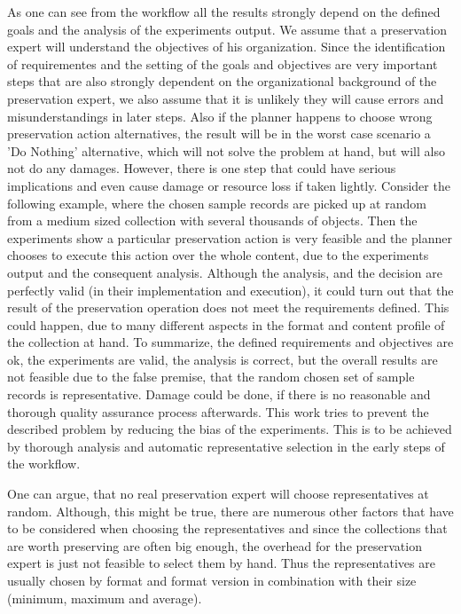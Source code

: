 As one can see from the workflow all the results strongly depend on the defined goals and the analysis of the experiments output. We assume that a preservation expert will understand the objectives of his organization. Since the identification of requirementes and the setting of the goals and objectives are very important steps that are also strongly dependent on the organizational background of the preservation expert, we also assume that it is unlikely they will cause errors and misunderstandings in later steps. Also if the planner happens to choose wrong preservation action alternatives, the result will be in the worst case scenario a 'Do Nothing' alternative, which will not solve the problem at hand, but will also not do any damages.
However, there is one step that could have serious implications and even cause damage or resource loss if taken lightly. Consider the following example, where the chosen sample records are picked up at random from a medium sized collection with several thousands of objects. Then the experiments show a particular preservation action is very feasible and the planner chooses to execute this action over the whole content, due to the experiments output and the consequent analysis. Although the analysis, and the decision are perfectly valid (in their implementation and execution), it could turn out that the result of the preservation operation does not meet the requirements defined. This could happen, due to many different aspects in the format and content profile of the collection at hand. To summarize, the defined requirements and objectives are ok, the experiments are valid, the analysis is correct, but the overall results are not feasible due to the false premise, that the random chosen set of sample records is representative. Damage could be done, if there is no reasonable and thorough quality assurance process afterwards. This work tries to prevent the described problem by reducing the bias of the experiments. This is to be achieved by thorough analysis and automatic representative selection in the early steps of the workflow.

One can argue, that no real preservation expert will choose representatives at random. Although, this might be true, there are numerous other factors that have to be considered when choosing the representatives and since the collections that are worth preserving are often big enough, the overhead for the preservation expert is just not feasible to select them by hand. Thus the representatives are usually chosen by format and format version in combination with their size (minimum, maximum and average).

